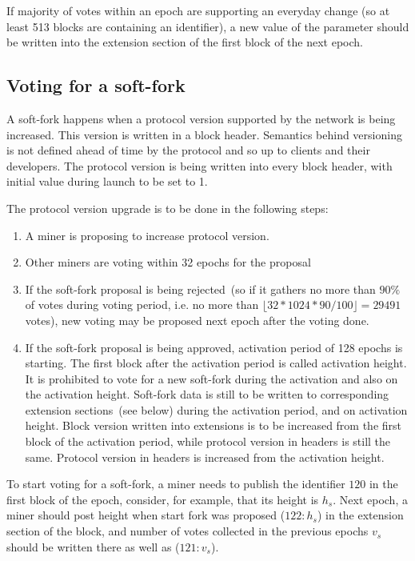 If majority of votes within an epoch are supporting an everyday change (so at least 513 blocks are containing an
identifier), a new value of the parameter should be written into the extension section of the first block of the next
epoch.

\subsection{Voting for a soft-fork}

A soft-fork happens when a protocol version supported by the network is being increased. This version is written in a block
header. Semantics behind versioning is not defined ahead of time by the protocol and so up to clients and their
developers. The protocol version is being written into every block header, with initial value during launch to be set
to 1.

The protocol version upgrade is to be done in the following steps:
\begin{enumerate}
    \item{} A miner is proposing to increase protocol version.
    \item{} Other miners are voting within 32 epochs for the proposal
    \item{} If the soft-fork proposal is being rejected~(so if it gathers no more than $90\%$ of votes during voting period, i.e.
            no more than $\lfloor 32 * 1024 * 90 / 100 \rfloor = 29491$ votes), new voting may be proposed next epoch
            after the voting done.
    \item{} If the soft-fork proposal is being approved, activation period of 128 epochs is starting. The first block
    after the activation period is called activation height. It is prohibited to vote for a new soft-fork during the
    activation and also on the activation height. Soft-fork data is still to be
    written to corresponding extension sections~(see below) during the activation period, and on activation height.
    Block version written into extensions is to be increased from the first block of the activation period, while protocol
    version in headers is still the same. Protocol version in headers is increased from the activation height.
\end{enumerate}


To start voting for a soft-fork, a miner needs to publish the identifier $120$ in the first block of the epoch, consider,
for example, that its height is $h_s$. Next epoch, a miner should post height when start fork was proposed ($122: h_s$)
in the extension section of the block, and number of votes collected in the previous epochs $v_s$ should be written
there as well as ($121: v_s$).

